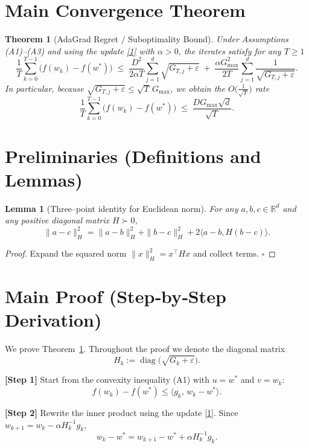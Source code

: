 \documentclass{article}
\newtheorem{theorem}{Theorem}
\newtheorem{lemma}{Lemma}
\newcommand{\R}{\mathbb{R}}
\begin{document}
\section*{Main Convergence Theorem}
\begin{theorem}[AdaGrad Regret / Suboptimality Bound]\label{thm:adagrad}
Under Assumptions (A1)–(A3) and using the update \eqref{1} with $\alpha>0$, the iterates satisfy for any $T\ge 1$
\[
\frac{1}{T}\sum_{k=0}^{T-1}\bigl(f(w_{k})-f(w^{*})\bigr)
   \;\le\;
   \frac{D^{2}}{2\alpha T}\sum_{j=1}^{d}\sqrt{G_{T,j}+\varepsilon}
   \;+\;
   \frac{\alpha G_{\max}^{2}}{2T}\sum_{j=1}^{d}\frac{1}{\sqrt{G_{T,j}+\varepsilon}} .
\tag{2}
\]
In particular, because $\sqrt{G_{T,j}+\varepsilon}\le\sqrt{T}\,G_{\max}$, we obtain the $O\!\bigl(\frac{1}{\sqrt{T}}\bigr)$ rate
\[
\frac{1}{T}\sum_{k=0}^{T-1}\bigl(f(w_{k})-f(w^{*})\bigr)
   \;\le\;
   \frac{D G_{\max}\sqrt{d}}{\sqrt{T}} .
\tag{3}
\]
\end{theorem}

\section*{Preliminaries (Definitions and Lemmas)}
\begin{lemma}[Three–point identity for Euclidean norm]\label{lem:threepoint}
For any $a,b,c\in\R^{d}$ and any positive diagonal matrix $H\succ0$,
\[
\|a-c\|_{H}^{2}
   =\|a-b\|_{H}^{2}+\|b-c\|_{H}^{2}+2\langle a-b, H(b-c)\rangle .
\tag{4}
\]
\end{lemma}
\begin{proof}
Expand the squared norm $\|x\|_{H}^{2}=x^{\top}Hx$ and collect terms. \hfill $\square$
\end{proof}

\section*{Main Proof (Step‑by‑Step Derivation)}
We prove Theorem~\ref{thm:adagrad}. Throughout the proof we denote the diagonal matrix
\[
H_{k}:=\operatorname{diag}\!\bigl(\sqrt{G_{k}+\varepsilon}\bigr) .
\]

\noindent\textbf{[Step 1]}  Start from the convexity inequality (A1) with $u=w^{*}$ and $v=w_{k}$:
\[
f(w_{k})-f(w^{*})\le\langle g_{k},\,w_{k}-w^{*}\rangle .
\tag{5}
\]

\noindent\textbf{[Step 2]}  Rewrite the inner product using the update \eqref{1}. Since $w_{k+1}=w_{k}-\alpha H_{k}^{-1}g_{k}$,
\[
w_{k}-w^{*}=w_{k+1}-w^{*}+\alpha H_{k}^{-1}g_{k}.
\tag{6}
\]
\end{document}
